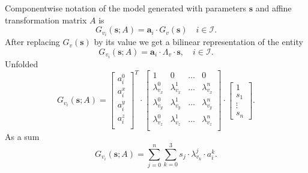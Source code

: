 Componentwise notation of the model
generated with parameters $\pmb{s}$ and affine transformation matrix $A$
is
\begin{equation*}
  G_{v_i}\left( \pmb{s}; A \right)
  = \pmb{a}_i \cdot G_v\left( \pmb{s} \right)
  \quad i \in \mathcal{I}.
\end{equation*}
After replacing $G_v\left( \pmb{s} \right)$ by its value we get
a bilinear representation of the entity
\begin{equation*}
  G_{v_i}\left( \pmb{s}; A \right)
  = \pmb{a}_i \cdot \Lambda_v \cdot \pmb{s},
  \quad i \in \mathcal{I}.
\end{equation*}
Unfolded
\begin{equation*}
  G_{v_i}\left( \pmb{s}; A \right)
  = \begin{bmatrix}
      a^0_i \\
      a_i^x \\
      a_i^y \\
      a_i^z \\
    \end{bmatrix}^T
    \cdot \begin{bmatrix}
      1               & 0               & \dots & 0 \\
      \lambda^0_{v_x} & \lambda^1_{v_x} & \dots & \lambda^n_{v_x} \\
      \lambda^0_{v_y} & \lambda^1_{v_y} & \dots & \lambda^n_{v_y} \\
      \lambda^0_{v_z} & \lambda^1_{v_z} & \dots & \lambda^n_{v_z} \\
    \end{bmatrix}
    \cdot \begin{bmatrix}
      1 \\
      s_1 \\
      \vdots \\
      s_n
    \end{bmatrix}.
\end{equation*}
As a sum
\begin{equation*}
  G_{v_i}\left( \pmb{s}; A \right)
  = \sum\limits_{j = 0}^{n} \sum\limits_{k = 0}^{3}
    s_{j} \cdot \lambda^{j}_{v_k} \cdot a_i^{k}.
\end{equation*}
